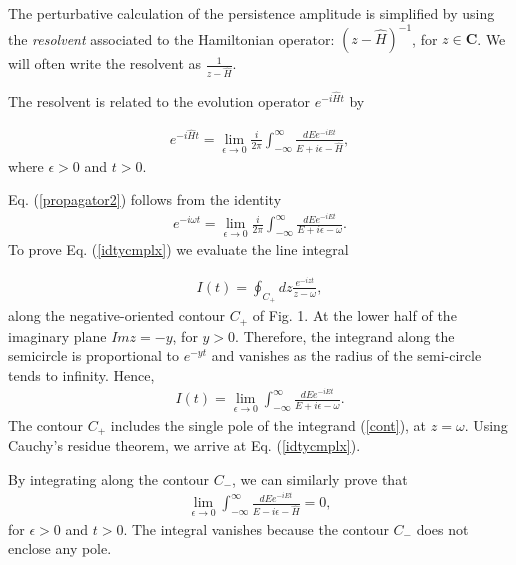 \documentclass[12pt]{article}
\numberwithin{equation}{section}
\begin{document}
\medskip

 The perturbative calculation of the persistence amplitude is simplified by using the {\em resolvent} associated to the Hamiltonian operator:
  $(z - \hat{H})^{-1}$, for $z \in {\pmb C}$. We will often write the resolvent  as $\frac{1}{z - \hat{H}}$.



The resolvent is related to the evolution operator $e^{-i\hat{H}t}$ by


\begin{eqnarray}
e^{-i\hat{H}t} = \lim_{\epsilon \rightarrow 0} \frac{i}{2\pi  } \int_{-\infty }^{\infty } \frac{dE e^{-iEt}}{E+ i \epsilon - \hat{H}},  \label{propagator2}
\end{eqnarray}
where $\epsilon > 0$  and $t > 0$.

Eq. (\ref{propagator2}) follows from  the identity
\begin{eqnarray}
e^{- i \omega t} =  \lim_{\epsilon \rightarrow 0} \frac{i}{2\pi  } \int_{-\infty }^{\infty } \frac{dE e^{-iEt}}{E+ i \epsilon - \omega}. \label{idtycmplx}
\end{eqnarray}
 To prove Eq. (\ref{idtycmplx}) we evaluate the line integral

 \begin{eqnarray}
I(t) = \oint_{C_+} dz \frac{e^{-izt}}{z - \omega}, \label{cont}
\end{eqnarray}
along the negative-oriented contour $C_+$ of Fig. 1. At the lower half of the imaginary plane $Im z  =  - y$, for $y >0$. Therefore, the integrand along the semicircle is proportional to $e^{-yt}$ and vanishes as the radius of the semi-circle tends to infinity. Hence,
\begin{eqnarray}
I(t) = \lim_{\epsilon \rightarrow 0} \int_{-\infty }^{\infty } \frac{dE e^{-iEt}}{E+ i \epsilon - \omega}.
\end{eqnarray}
The contour $C_+$ includes the single pole of the integrand (\ref{cont}), at $z = \omega$. Using Cauchy's residue theorem, we arrive at Eq. (\ref{idtycmplx}).

By integrating along the contour $C_-$, we can similarly prove that
\begin{eqnarray}
\lim_{\epsilon \rightarrow 0}   \int_{-\infty }^{\infty } \frac{dE e^{-iEt}}{E -  i \epsilon - \hat{H}} = 0 ,  \label{propagator2b}
\end{eqnarray}
for $\epsilon > 0$  and $t > 0$. The   integral vanishes because the contour $C_-$ does not enclose any pole.
\end{document}
